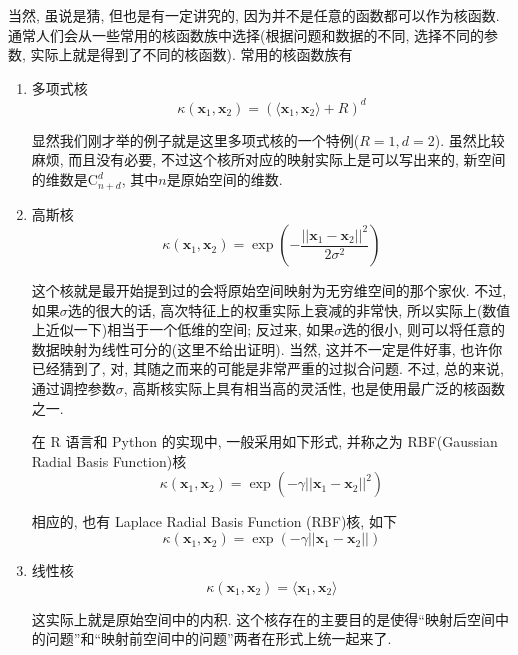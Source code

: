 \documentclass[a4paper,UTF8]{ctexart}
\theoremstyle{plain} \newtheorem{theorem}{定理}[section]
\theoremstyle{plain} \newtheorem{definition}{定义}[section]
\theoremstyle{plain} \newtheorem{lemma}{引理}[section]
\theoremstyle{plain} \newtheorem{proposition}{命题}[section]
\theoremstyle{plain} \newtheorem{example}{例}
\theoremstyle{plain} \newtheorem{remark}{注}
\theoremstyle{plain} \newtheorem{corollary}{推论}[section]
\begin{document}
当然, 虽说是猜, 但也是有一定讲究的, 因为并不是任意的函数都可以作为核函数. 通常人们会从一些常用的核函数族中选择(根据问题和数据的不同, 选择不同的参数, 实际上就是得到了不同的核函数). 常用的核函数族有
\begin{enumerate}
\item 多项式核
\begin{equation*}
\kappa(\bm{x}_{1},\bm{x}_{2}) = \left( \langle \bm{x}_1,\bm{x}_2 \rangle + R \right)^{d}
\end{equation*}

显然我们刚才举的例子就是这里多项式核的一个特例($R = 1, d = 2$). 虽然比较麻烦, 而且没有必要, 不过这个核所对应的映射实际上是可以写出来的, 新空间的维数是$\mathrm{C}_{n+d}^{d}$, 其中$n$是原始空间的维数.

\item 高斯核
\begin{equation*}
\kappa (\bm{x}_{1},\bm{x}_{2}) = \exp \left( - \frac{||\bm{x}_1 - \bm{x}_2||^2}{2 \sigma^2} \right)
\end{equation*}

这个核就是最开始提到过的会将原始空间映射为无穷维空间的那个家伙. 不过, 如果$\sigma$选的很大的话, 高次特征上的权重实际上衰减的非常快, 所以实际上(数值上近似一下)相当于一个低维的空间; 反过来, 如果$\sigma$选的很小, 则可以将任意的数据映射为线性可分的(这里不给出证明). 当然, 这并不一定是件好事, 也许你已经猜到了, 对, 其随之而来的可能是非常严重的过拟合问题. 不过, 总的来说, 通过调控参数$\sigma$, 高斯核实际上具有相当高的灵活性, 也是使用最广泛的核函数之一. 

在 R 语言和 Python 的实现中, 一般采用如下形式, 并称之为 RBF(Gaussian Radial Basis Function)核
\begin{equation*}
\kappa (\bm{x}_{1},\bm{x}_{2}) = \exp (- \gamma ||\bm{x}_1 - \bm{x}_2||^2)
\end{equation*}

相应的, 也有 Laplace Radial Basis Function (RBF)核, 如下
\begin{equation*}
\kappa (\bm{x}_{1},\bm{x}_{2}) = \exp (- \gamma ||\bm{x}_1 - \bm{x}_2||)
\end{equation*}

\item 线性核
\begin{equation*}
\kappa (\bm{x}_{1},\bm{x}_{2}) = \langle \bm{x}_1,\bm{x}_2 \rangle
\end{equation*}

这实际上就是原始空间中的内积. 这个核存在的主要目的是使得“映射后空间中的问题”和“映射前空间中的问题”两者在形式上统一起来了.

\end{enumerate}
\end{document}
